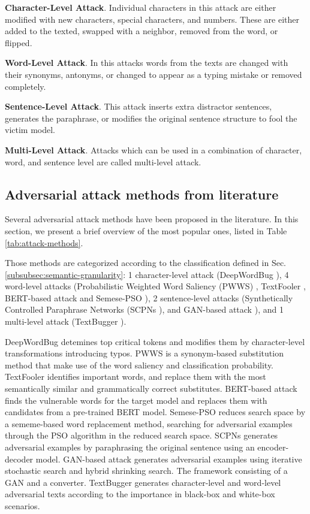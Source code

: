\textbf{Character-Level Attack}. Individual characters in this attack are either modified with new characters, special characters, and numbers. These are either added to the texted, swapped with a neighbor, removed from the word, or flipped.

\textbf{Word-Level Attack}. In this attacks words from the texts are changed with their synonyms, antonyms, or changed to appear as a typing mistake or removed completely.

\textbf{Sentence-Level Attack}. This attack inserts extra distractor sentences, generates the paraphrase, or modifies the original sentence structure to fool the victim model.

\textbf{Multi-Level Attack}. Attacks which can be used in a combination of character, word, and sentence level are called multi-level attack.

\subsection{Adversarial attack methods from literature}\label{subsec:aam-from-literature}

Several adversarial attack methods have been proposed in the literature. In this section, we present a brief overview of the most popular ones, listed in Table \ref{tab:attack-methods}.

Those methods are categorized according to the classification defined in Sec. \ref{subsubsec:semantic-granularity}:
1 character-level attack (DeepWordBug \cite{journals/corr/abs-1801-04354}), 4 word-level attacks (Probabilistic Weighted Word Saliency (PWWS) \cite{conf/acl/RenDHC19}, TextFooler \cite{journals/corr/abs-1907-11932}, BERT-based attack \cite{conf/emnlp/LiMGXQ20} and Semese-PSO \cite{conf/acl/ZangQYLZLS20}), 2 sentence-level attacks (Synthetically Controlled Paraphrase Networks (SCPNs \cite{conf/naacl/IyyerWGZ18}), and GAN-based attack \cite{journals/corr/abs-1710-11342}), and 1 multi-level attack (TextBugger \cite{conf/ndss/LiJDLW19}).

DeepWordBug detemines top critical tokens and modifies them by character-level transformations introducing typos. 
PWWS is a synonym-based substitution method that make use of the word saliency and classification probability.
TextFooler identifies important words, and replace them with the most semantically similar and grammatically correct substitutes.
BERT-based attack finds the vulnerable words for the target model and replaces them with candidates from a pre-trained BERT model.
Semese-PSO reduces search space by a sememe-based word replacement method, searching for adversarial examples through the PSO algorithm in the reduced search space.
SCPNs generates adversarial examples by paraphrasing the original sentence using an encoder-decoder model.
GAN-based attack generates adversarial examples using iterative stochastic search and hybrid shrinking search. The framework consisting of a GAN and a converter.
TextBugger generates character-level and word-level adversarial texts according to the importance in black-box and white-box scenarios.

